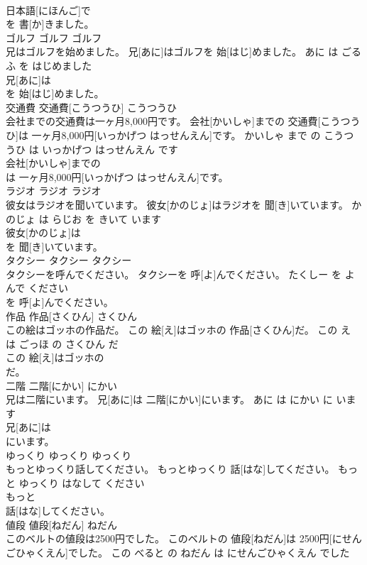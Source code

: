 \documentclass[8pt]{extreport}
\begin{document}
\begin{CJK}{UTF8}{min}
\\	日本語[にほんご]で
\\	を 書[か]きました。			
\\	ゴルフ	ゴルフ	ゴルフ	
\\	兄はゴルフを始めました。	兄[あに]はゴルフを 始[はじ]めました。	あに は ごるふ を はじめました	
\\	兄[あに]は
\\	を 始[はじ]めました。			
\\	交通費	交通費[こうつうひ]	こうつうひ	
\\	会社までの交通費は一ヶ月8,000円です。	会社[かいしゃ]までの 交通費[こうつうひ]は 一ヶ月8,000円[いっかげつ はっせんえん]です。	かいしゃ まで の こうつうひ は いっかげつ はっせんえん です	
\\	会社[かいしゃ]までの
\\	は 一ヶ月8,000円[いっかげつ はっせんえん]です。			
\\	ラジオ	ラジオ	ラジオ	
\\	彼女はラジオを聞いています。	彼女[かのじょ]はラジオを 聞[き]いています。	かのじょ は らじお を きいて います	
\\	彼女[かのじょ]は
\\	を 聞[き]いています。			
\\	タクシー	タクシー	タクシー	
\\	タクシーを呼んでください。	タクシーを 呼[よ]んでください。	たくしー を よんで ください	
\\	を 呼[よ]んでください。			
\\	作品	作品[さくひん]	さくひん	
\\	この絵はゴッホの作品だ。	この 絵[え]はゴッホの 作品[さくひん]だ。	この え は ごっほ の さくひん だ	
\\	この 絵[え]はゴッホの
\\	だ。			
\\	二階	二階[にかい]	にかい	
\\	兄は二階にいます。	兄[あに]は 二階[にかい]にいます。	あに は にかい に います	
\\	兄[あに]は
\\	にいます。			
\\	ゆっくり	ゆっくり	ゆっくり	
\\	もっとゆっくり話してください。	もっとゆっくり 話[はな]してください。	もっと ゆっくり はなして ください	
\\	もっと
\\	話[はな]してください。			
\\	値段	値段[ねだん]	ねだん	
\\	このベルトの値段は2500円でした。	このベルトの 値段[ねだん]は 2500円[にせんごひゃくえん]でした。	この べると の ねだん は にせんごひゃくえん でした	

\end{CJK}
\end{document}

